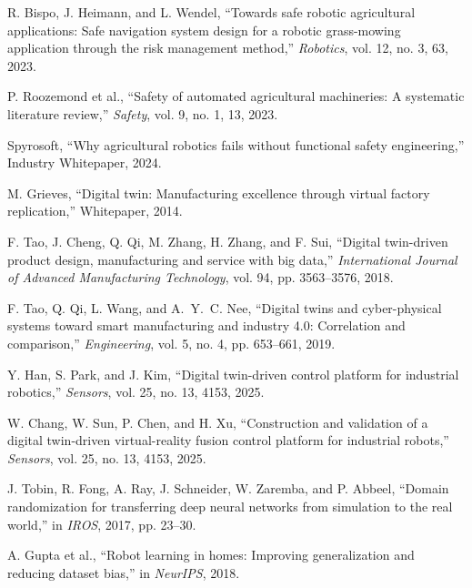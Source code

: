 \documentclass[12pt,a4paper,oneside]{book}
\begin{document}
\begin{enumerate}[label={[\arabic*]}, leftmargin=*]
\item \label{Bispo2023} R. Bispo, J. Heimann, and L. Wendel, ``Towards safe robotic agricultural applications: Safe navigation system design for a robotic grass-mowing application through the risk management method,'' \emph{Robotics}, vol. 12, no. 3, 63, 2023.

\item \label{Roozemond2024} P. Roozemond et al., ``Safety of automated agricultural machineries: A systematic literature review,'' \emph{Safety}, vol. 9, no. 1, 13, 2023.

\item \label{Spyrosoft2024} Spyrosoft, ``Why agricultural robotics fails without functional safety engineering,'' Industry Whitepaper, 2024.

\item \label{Grieves2014} M. Grieves, ``Digital twin: Manufacturing excellence through virtual factory replication,'' Whitepaper, 2014.

\item \label{Tao2018} F. Tao, J. Cheng, Q. Qi, M. Zhang, H. Zhang, and F. Sui, ``Digital twin-driven product design, manufacturing and service with big data,'' \emph{International Journal of Advanced Manufacturing Technology}, vol. 94, pp. 3563--3576, 2018.

\item \label{Tao2019} F. Tao, Q. Qi, L. Wang, and A.~Y.~C. Nee, ``Digital twins and cyber-physical systems toward smart manufacturing and industry 4.0: Correlation and comparison,'' \emph{Engineering}, vol. 5, no. 4, pp. 653--661, 2019.

\item \label{Han2025} Y. Han, S. Park, and J. Kim, ``Digital twin-driven control platform for industrial robotics,'' \emph{Sensors}, vol. 25, no. 13, 4153, 2025.

\item \label{Chang2025} W. Chang, W. Sun, P. Chen, and H. Xu, ``Construction and validation of a digital twin-driven virtual-reality fusion control platform for industrial robots,'' \emph{Sensors}, vol. 25, no. 13, 4153, 2025.

\item \label{Tobin2017} J. Tobin, R. Fong, A. Ray, J. Schneider, W. Zaremba, and P. Abbeel, ``Domain randomization for transferring deep neural networks from simulation to the real world,'' in \emph{IROS}, 2017, pp. 23--30.

\item \label{GuptaDA2018} A. Gupta et al., ``Robot learning in homes: Improving generalization and reducing dataset bias,'' in \emph{NeurIPS}, 2018.


\end{enumerate}
\end{document}
